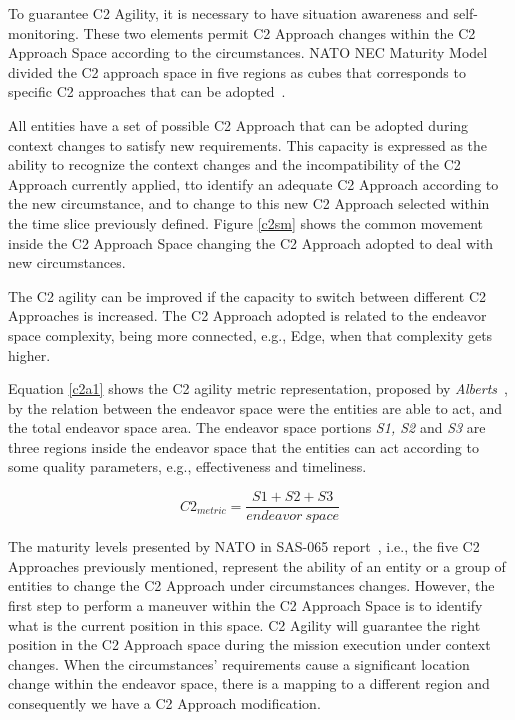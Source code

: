 To guarantee C2 Agility, it is necessary to have situation awareness and self-monitoring. These two elements permit C2 Approach changes within the C2 Approach Space according to the circumstances. NATO NEC Maturity Model divided the C2 approach space in five regions as cubes that corresponds to specific C2 approaches that can be adopted~\cite{FRANCE2014}. 

All entities have a set of possible C2 Approach that can be adopted during context changes to satisfy new requirements. This capacity is expressed as the ability to recognize the context changes and the incompatibility of the C2 Approach currently applied, tto identify an adequate C2 Approach according to the new circumstance, and to change to this new C2 Approach selected within the time slice previously defined. Figure \ref{c2sm} shows the common movement inside the C2 Approach Space changing the C2 Approach adopted to deal with new circumstances.

%

The C2 agility can be improved if the capacity to switch between different C2 Approaches is increased. The C2 Approach adopted is related to the endeavor space complexity, being more connected, e.g., Edge, when that complexity gets higher.

Equation \ref{c2a1} shows the C2 agility metric representation, proposed by \textit{Alberts}~\cite{Alberts2017}, by the relation between the endeavor space were the entities are able to act, and the total endeavor space area. The endeavor space portions \textit{S1, S2} and \textit{S3} are three regions inside the endeavor space that the entities can act according to some quality parameters, e.g., effectiveness and timeliness. 

\begin{equation}
\label{c2a1}
 C2_{metric} = \frac{S1 + S2 + S3}{endeavor\ space}  
\end{equation}

The maturity levels presented by NATO in SAS-065 report~\cite{nato01}, i.e., the five C2 Approaches previously mentioned, represent the ability of an entity or a group of entities to change the C2 Approach under circumstances changes. However, the first step to perform a maneuver within the C2 Approach Space is to identify what is the current position in this space. C2 Agility will guarantee the right position in the C2 Approach space during the mission execution under context changes. When the circumstances' requirements cause a significant location change within the endeavor space, there is a mapping to a different region and consequently we have a C2 Approach modification. 

